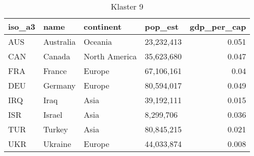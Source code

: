 \begin{table}
    \centering
    \caption{Klaster 9}
    \label{tab:cl9}
    \begin{tabular}{llllr}
        \toprule
        iso\_a3 & name      & continent     & pop\_est   & gdp\_per\_cap \\
        \midrule
        AUS     & Australia & Oceania       & 23,232,413 & 0.051         \\
        CAN     & Canada    & North America & 35,623,680 & 0.047         \\
        FRA     & France    & Europe        & 67,106,161 & 0.04          \\
        DEU     & Germany   & Europe        & 80,594,017 & 0.049         \\
        IRQ     & Iraq      & Asia          & 39,192,111 & 0.015         \\
        ISR     & Israel    & Asia          & 8,299,706  & 0.036         \\
        TUR     & Turkey    & Asia          & 80,845,215 & 0.021         \\
        UKR     & Ukraine   & Europe        & 44,033,874 & 0.008         \\
        \bottomrule
    \end{tabular}
\end{table}
